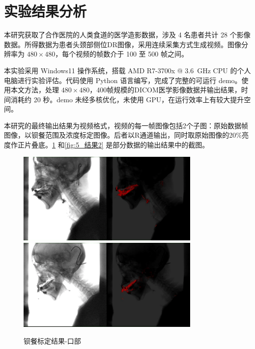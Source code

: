 \section{实验结果分析}\label{sec:-2}

本研究获取了合作医院的人类食道的医学造影数据，涉及 4 名患者共计 28 个影像数据。所得数据为患者头颈部侧位DR图像，采用连续采集方式生成视频。图像分辨率为 $480 \times 480$，每个视频的帧数介于 100 至 500 帧之间。

本实验采用 Windows11 操作系统，搭载 AMD R7-3700x @ \SI{3.6}{\giga\hertz} CPU 的个人电脑进行实验评估。代码使用 Python 语言编写，完成了完整的可运行 demo。使用本文方法，处理 $480 \times 480$，400帧规模的DICOM医学影像数据并输出结果，时间消耗约 20 秒。demo 未经多核优化，未使用 GPU，在运行效率上有较大提升空间。

本研究的最终输出结果为视频格式，视频的每一帧图像包括2个子图：原始数据帧图像，以钡餐范围及浓度标定图像。后者以R通道输出，同时取原始图像的20\%亮度作正片叠底。\cref{fig:5_结果1} 和\cref{fig:5_结果2} 是部分数据的输出结果中的截图。
\begin{figure}[!htp]
    \centering
    \includegraphics[width=0.8\textwidth]{figures/511.png}
    \includegraphics[width=0.8\textwidth]{figures/513.png}
    \caption{钡餐标定结果-口部}
    \label{fig:5_结果1}
\end{figure}

